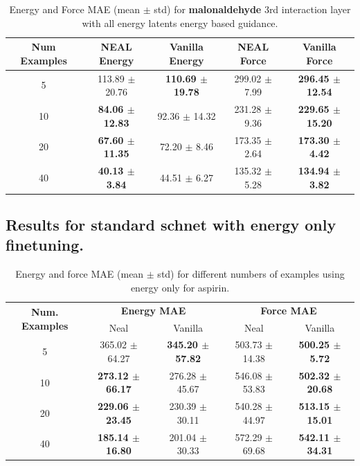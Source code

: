 \documentclass[12pt]{article}
\theoremstyle{definition}
\theoremstyle{remark}
\begin{document}
\begin{table}[htbp!]
\centering
\begin{tabular}{c|cc|cc}
\hline
\textbf{Num Examples} &
\textbf{NEAL Energy} & \textbf{Vanilla Energy} &
\textbf{NEAL Force} & \textbf{Vanilla Force} \\
\hline
5  &
113.89 $\pm$ 20.76 &
\textbf{110.69 $\pm$ 19.78} &
299.02 $\pm$ 7.99 &
\textbf{296.45 $\pm$ 12.54} \\

10 &
\textbf{84.06 $\pm$ 12.83} &
92.36 $\pm$ 14.32 &
231.28 $\pm$ 9.36 &
\textbf{229.65 $\pm$ 15.20} \\

20 &
\textbf{67.60 $\pm$ 11.35} &
72.20 $\pm$ 8.46 &
173.35 $\pm$ 2.64 &
\textbf{173.30 $\pm$ 4.42} \\

40 &
\textbf{40.13 $\pm$ 3.84} &
44.51 $\pm$ 6.27 &
135.32 $\pm$ 5.28 &
\textbf{134.94 $\pm$ 3.82} \\
\hline
\end{tabular}
\caption{Energy and Force MAE (mean $\pm$ std) for \textbf{malonaldehyde} 3rd interaction layer with all energy latents energy based guidance.}
\end{table}

\newpage
\subsection{Results for standard schnet with energy only finetuning.}
\begin{table}[ht]
\centering

\label{tab:energy_force_mae}
\begin{tabular}{c|cc|cc}
\hline
\multirow{2}{*}{\textbf{Num. Examples}} 
& \multicolumn{2}{c|}{\textbf{Energy MAE}} 
& \multicolumn{2}{c}{\textbf{Force MAE}} \\
& Neal & Vanilla & Neal & Vanilla \\
\hline
5  & 365.02 $\pm$ 64.27 & \textbf{345.20 $\pm$ 57.82}
   & 503.73 $\pm$ 14.38 & \textbf{500.25 $\pm$ 5.72} \\

10 & \textbf{273.12 $\pm$ 66.17} & 276.28 $\pm$ 45.67
   & 546.08 $\pm$ 53.83 & \textbf{502.32 $\pm$ 20.68} \\

20 & \textbf{229.06 $\pm$ 23.45} & 230.39 $\pm$ 30.11
   & 540.28 $\pm$ 44.97 & \textbf{513.15 $\pm$ 15.01} \\

40 & \textbf{185.14 $\pm$ 16.80} & 201.04 $\pm$ 30.33
   & 572.29 $\pm$ 69.68 & \textbf{542.11 $\pm$ 34.31} \\
\hline

\end{tabular}
\caption{Energy and force MAE (mean $\pm$ std) for different numbers of examples using energy only for aspirin.}
\end{table}
\end{document}
